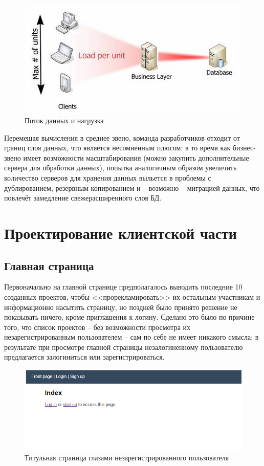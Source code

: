 \documentclass[a4paper, 14pt]{extarticle}
\begin{document}
\begin{figure}[!htb]
  \centering
    \includegraphics[scale=0.5]{../shared_images/business-logic/scaling.jpg}
   \caption{Поток данных и нагрузка}
    \label{fig:start}
\end{figure}

Перемещая вычисления в среднее звено, команда разработчиков отходит от границ слоя данных, что является несомненным плюсом: в то время как бизнес-звено имеет возможности масштабирования (можно закупить дополнительные сервера для обработки данных), попытка аналогичным образом увеличить количество серверов для хранения данных выльется в проблемы с дублированием, резервным копированием и -- возможно -- миграцией данных, что повлечёт замедление свежерасширенного слоя БД.

\section{Проектирование клиентской части}
\subsection{Главная страница}
Первоначально на главной странице предполагалось выводить последние 10 созданных проектов, чтобы <<прорекламировать>> их остальным участникам и информационно насытить страницу, но поздней было принято решение не показывать ничего, кроме приглашения к логину. Сделано это было по причине того, что список проектов -- без возможности просмотра их незарегистрированным пользователем -- сам по себе не имеет никакого смысла; в результате при просмотре главной страницы незалогиненному пользователю предлагается залогиниться или зарегистрироваться.

\begin{figure}[!htb]
  \centering
    \includegraphics[scale=0.75]{../shared_images/frontend/title-not-logged-in.png}
   \caption{Титульная страница глазами незарегистрированного пользователя}
    \label{fig:start}
\end{figure}
\end{document}
